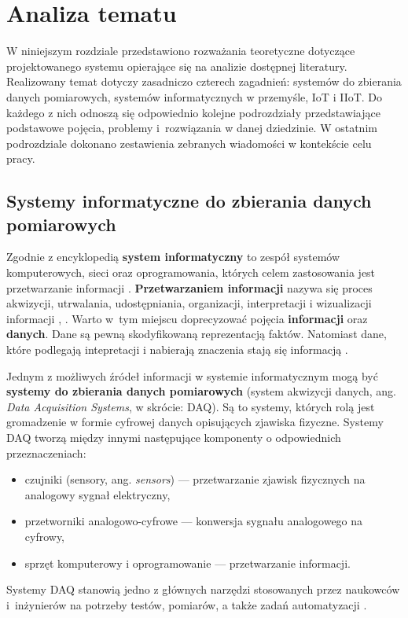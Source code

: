 \documentclass[a4paper, 12pt, twoside]{article}
\begin{document}
\section{Analiza tematu}\label{analiza}

W niniejszym rozdziale przedstawiono rozważania teoretyczne dotyczące projektowanego
systemu opierające się na analizie dostępnej literatury. Realizowany temat
dotyczy zasadniczo czterech zagadnień: systemów do zbierania danych pomiarowych,
systemów informatycznych w przemyśle, IoT i IIoT.  Do każdego z nich odnoszą się
odpowiednio kolejne podrozdziały przedstawiające podstawowe pojęcia, problemy i~rozwiązania
w danej dziedzinie.
W ostatnim podrozdziale dokonano zestawienia zebranych wiadomości w kontekście
celu pracy.

\subsection{Systemy informatyczne do zbierania danych pomiarowych} \label{system-do-zbierania-danych}

Zgodnie z encyklopedią \textbf{system informatyczny} to zespół systemów komputerowych,
sieci oraz oprogramowania, których celem zastosowania jest
przetwarzanie informacji \cite{system-informatyczny}.
\textbf{Przetwarzaniem informacji} nazywa się proces akwizycji, utrwalania, udostępniania,
organizacji, interpretacji i wizualizacji informacji \cite{information-science},
\cite{information-processing}. Warto w~tym miejscu doprecyzować pojęcia
\textbf{informacji} oraz \textbf{danych}. Dane są pewną skodyfikowaną reprezentacją
faktów. Natomiast dane, które podlegają intepretacji i nabierają znaczenia
stają się informacją \cite{dane-informacja-wiedza}.

Jednym z możliwych źródeł informacji w systemie informatycznym mogą być
\textbf{systemy do zbierania danych pomiarowych} (system akwizycji danych, ang. \emph{Data Acquisition Systems}, w skrócie: DAQ).
Są to systemy, których rolą jest gromadzenie w formie cyfrowej danych opisujących
zjawiska fizyczne. Systemy DAQ tworzą między innymi następujące komponenty
o odpowiednich przeznaczeniach:
\begin{itemize}
      \itemsep0em
      \item czujniki (sensory, ang. \emph{sensors}) --- przetwarzanie zjawisk fizycznych na analogowy sygnał elektryczny,
      \item przetworniki analogowo-cyfrowe --- konwersja sygnału analogowego na cyfrowy,
      \item sprzęt komputerowy i oprogramowanie --- przetwarzanie informacji.
\end{itemize}
Systemy DAQ stanowią jedno z głównych narzędzi stosowanych przez naukowców i~inżynierów
na potrzeby testów, pomiarów, a także zadań automatyzacji \cite{data-aq-systems}.
\end{document}
